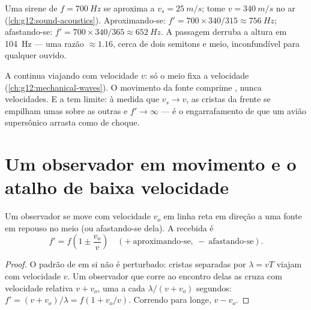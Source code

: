\begin{example}\label{ex:g12:doppler-effect:siren}
Uma sirene de $f = \qty{700}{Hz}$ se aproxima a
$v_s = \qty{25}{m/s}$; tome $v = \qty{340}{m/s}$ no ar
(\cref{ch:g12:sound-acoustics}). Aproximando-se:
$f' = 700 \times 340/315 \approx \qty{756}{Hz}$; afastando-se:
$f' = 700 \times 340/365 \approx \qty{652}{Hz}$. A passagem derruba a
altura em \qty{104}{Hz} --- uma razão $\approx 1.16$, cerca de dois
semitons e meio, inconfundível para qualquer ouvido.
\end{example}

\begin{remark}\label{rem:g12:doppler-effect:speed-unchanged}
A  continua viajando com velocidade $v$: só o meio fixa a velocidade
(\cref{ch:g12:mechanical-waves}). O movimento da fonte comprime
\emph{}, nunca velocidades. E a  tem
limite: à medida que $v_s \to v$, as cristas da frente se empilham umas
sobre as outras e $f' \to \infty$ --- é o engarrafamento de  que um avião supersônico arrasta como  de choque.
\end{remark}

\section{Um observador em movimento e o atalho de baixa velocidade}

\begin{proposition}\label{prop:g12:doppler-effect:moving-observer}
Um observador se move com velocidade $v_o$ em linha reta em direção a uma
fonte em repouso no meio (ou afastando-se dela). A  recebida é
\[ f' = f\left(1 \pm \frac{v_o}{v}\right) \quad (+\ \text{aproximando-se},\ -\ \text{afastando-se}). \]
\end{proposition}

\begin{proof}
O padrão de  em si não é perturbado: cristas separadas por
$\lambda = vT$ viajam com velocidade $v$. Um observador que corre ao
encontro delas as cruza com velocidade relativa $v + v_o$, uma a cada
$\lambda/(v + v_o)$ segundos: $f' = (v + v_o)/\lambda = f(1 + v_o/v)$.
Correndo para longe, $v - v_o$.
\end{proof}

